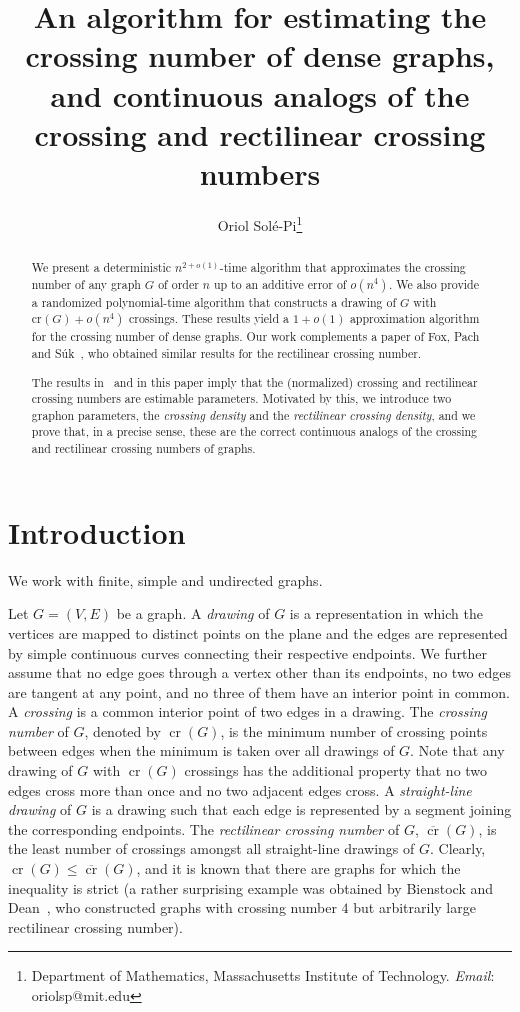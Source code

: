 \documentclass{article}
\title{An algorithm for estimating the crossing number of dense graphs, and continuous analogs of the crossing and rectilinear crossing numbers}
\author{Oriol Solé-Pi\footnote{Department of Mathematics, Massachusetts Institute of Technology. \textit{Email}: oriolsp@mit.edu}}
\date{}
\begin{document}
\maketitle

\begin{abstract}
We present a deterministic $n^{2+o(1)}$-time algorithm that approximates the crossing number of any graph $G$ of order $n$ up to an additive error of $o(n^4)$. We also provide a randomized polynomial-time algorithm that constructs a drawing of $G$ with $\text{cr}(G)+o(n^4)$ crossings. These results yield a $1+o(1)$ approximation algorithm for the crossing number of dense graphs. Our work complements a paper of Fox, Pach and Súk~\cite{approximatingrect}, who obtained similar results for the rectilinear crossing number.

The results in~\cite{approximatingrect} and in this paper imply that the (normalized) crossing and rectilinear crossing numbers are estimable parameters. Motivated by this, we introduce two graphon parameters, the \textit{crossing density} and the \textit{rectilinear crossing density}, and we prove that, in a precise sense, these are the correct continuous analogs of the crossing and rectilinear crossing numbers of graphs.\end{abstract}  

\section{Introduction}\label{sec:intro}

We work with finite, simple and undirected graphs.

Let $G=(V,E)$ be a graph. A \textit{drawing} of $G$ is a representation in which the vertices are mapped to distinct points on the plane and the edges are represented by simple continuous curves connecting their respective endpoints. We further assume that no edge goes through a vertex other than its endpoints, no two edges are tangent at any point, and no three of them have an interior point in common. A \textit{crossing} is a common interior point of two edges in a drawing. The \textit{crossing number} of $G$, denoted by $\mathop{\mathrm{cr}}(G)$, is the minimum number of crossing points between edges when the minimum is taken over all drawings of $G$. Note that any drawing of $G$ with $\mathop{\mathrm{cr}}(G)$ crossings has the additional property that no two edges cross more than once and no two adjacent edges cross. A \textit{straight-line drawing} of $G$ is a drawing such that each edge is represented by a segment joining the corresponding endpoints. The \textit{rectilinear crossing number} of $G$, $\overline{\mathop{\mathrm{cr}}}(G)$, is the least number of crossings amongst all straight-line drawings of $G$. Clearly, $\mathop{\mathrm{cr}}(G)\leq\overline{\mathop{\mathrm{cr}}}(G)$, and it is known that there are graphs for which the inequality is strict (a rather surprising example was obtained by Bienstock and Dean~\cite{cr4largecr}, who constructed graphs with crossing number $4$ but arbitrarily large rectilinear crossing number).
\end{document}
